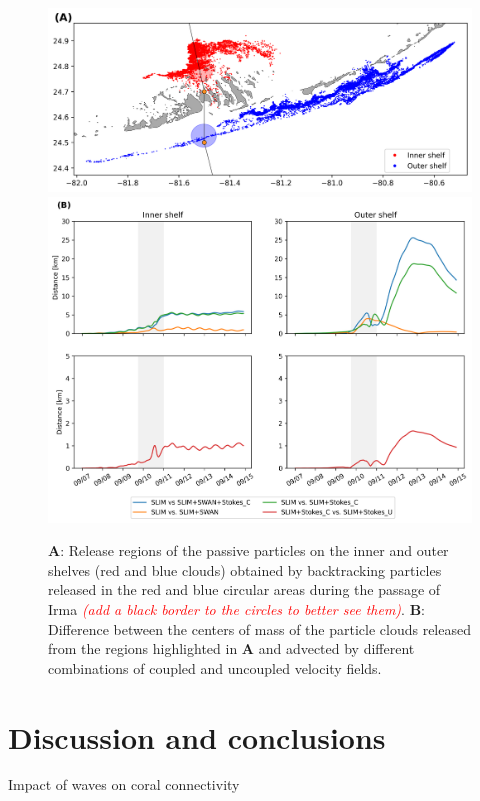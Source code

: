 \documentclass[11pt,a4paper]{article}
\newcommand{\emphc}[1]{\emph{\textcolor{red}{#1}}}
\begin{document}
\begin{figure}
    \centering
    \includegraphics[width=.85\textwidth]{fig/inner_outer_regions.png}
    \includegraphics[width=.99\textwidth]{fig/inner_outer.png}
    \caption{\textbf{A}: Release regions of the passive particles on the inner and outer shelves (red and blue clouds) obtained by backtracking particles released in the red and blue circular areas during the passage of Irma \emphc{(add a black border to the circles to better see them)}. \textbf{B}: Difference between the centers of mass of the particle clouds released from the regions highlighted in \textbf{A} and advected by different combinations of coupled and uncoupled velocity fields.}
    \label{fig:traj}
\end{figure}

\section{Discussion and conclusions}

Impact of waves on coral connectivity
\end{document}
